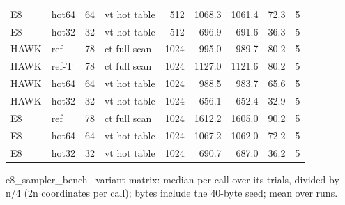 \begin{table}[t]
{\begin{tabular}{llrlrrrrr}
E8 & hot64 & 64 & vt hot table & 512 & 1068.3 & 1061.4 & 72.3 & 5 \\
E8 & hot32 & 32 & vt hot table & 512 & 696.9 & 691.6 & 36.3 & 5 \\
HAWK & ref & 78 & ct full scan & 1024 & 995.0 & 989.7 & 80.2 & 5 \\
HAWK & ref-T & 78 & ct full scan & 1024 & 1127.0 & 1121.6 & 80.2 & 5 \\
HAWK & hot64 & 64 & vt hot table & 1024 & 988.5 & 983.7 & 65.6 & 5 \\
HAWK & hot32 & 32 & vt hot table & 1024 & 656.1 & 652.4 & 32.9 & 5 \\
E8 & ref & 78 & ct full scan & 1024 & 1612.2 & 1605.0 & 90.2 & 5 \\
E8 & hot64 & 64 & vt hot table & 1024 & 1067.2 & 1062.0 & 72.2 & 5 \\
E8 & hot32 & 32 & vt hot table & 1024 & 690.7 & 687.0 & 36.2 & 5 \\
\bottomrule
\end{tabular}}
\par\smallskip\parbox{\linewidth}{\scriptsize e8\_sampler\_bench --variant-matrix: median per call over its trials, divided by n/4 (2n coordinates per call); bytes include the 40-byte seed; mean over runs.}
\end{table}

